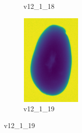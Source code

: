\documentclass[11pt]{article}
\begin{document}
\begin{figure}
\begin{subfigure}[b]{0.15\textwidth}
        \caption{v12\_1\_18}
         \label{fig:five over x}
     \end{subfigure}
     \hfill
    \begin{subfigure}[b]{0.15\textwidth}
         \centering
         \includegraphics[width=3cm, height=4.5cm]{images/kartofler/v12_1_19_cut.png}
        \caption{v12\_1\_19}
         \label{fig:five over x}
     \end{subfigure}
\end{figure}








\newpage
\end{document}
